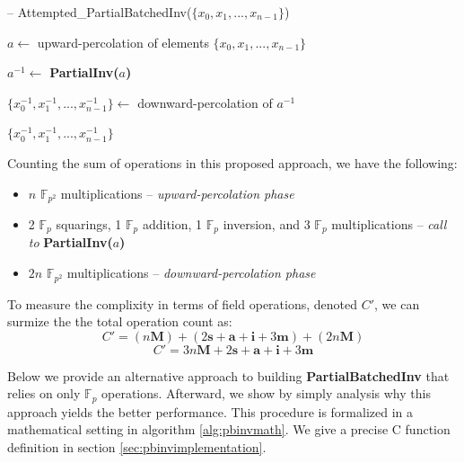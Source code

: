 \begin{algorithm}
\caption{-- Attempted\_PartialBatchedInv($\{x_0, x_1, ... , x_{n-1}\}$)}\label{alg:partialinv}
\begin{algorithmic}[1]
\State $a \gets$ upward-percolation of elements $\{x_0, x_1, ... , x_{n-1}\}$

\State $a^{-1} \gets$ \textbf{PartialInv($a$)}

\State $\{x_{0}^{-1}, x_{1}^{-1}, ... , x_{n-1}^{-1}\} \gets$ downward-percolation of $a^{-1}$

\State \Return $\{x_{0}^{-1}, x_{1}^{-1}, ... , x_{n-1}^{-1}\}$
\end{algorithmic}
\end{algorithm}
\noindent
Counting the sum of operations in this proposed approach, we have the following: 
\begin{itemize}
\item $n$ $\mathbb{F}_{p^2}$ multiplications -- \emph{upward-percolation phase}
\item 2 $\mathbb{F}_{p}$ squarings, 1 $\mathbb{F}_{p}$ addition, 1 $\mathbb{F}_{p}$ inversion, and 3 $\mathbb{F}_{p}$ multiplications -- \emph{call to} \textbf{PartialInv($a$)}
\item $2n$ $\mathbb{F}_{p^2}$ multiplications -- \emph{downward-percolation phase}
\end{itemize}
To measure the complixity in terms of field operations, denoted $C'$, we can surmize the the total operation count as:
$$
C' = (n\textbf{M}) + (2\textbf{s} + \textbf{a} + \textbf{i} + 3\textbf{m}) + (2n\textbf{M})
$$
$$
C' = 3n\textbf{M} + 2\textbf{s} + \textbf{a} + \textbf{i} + 3\textbf{m}
$$

Below we provide an alternative approach to building \textbf{PartialBatchedInv} that relies on only $\mathbb{F}_{p}$ operations. Afterward, we show by simply analysis why this approach yields the better performance. This procedure is formalized in a mathematical setting in algorithm \ref{alg:pbinvmath}. We give a precise C function definition in section \ref{sec:pbinvimplementation}.

